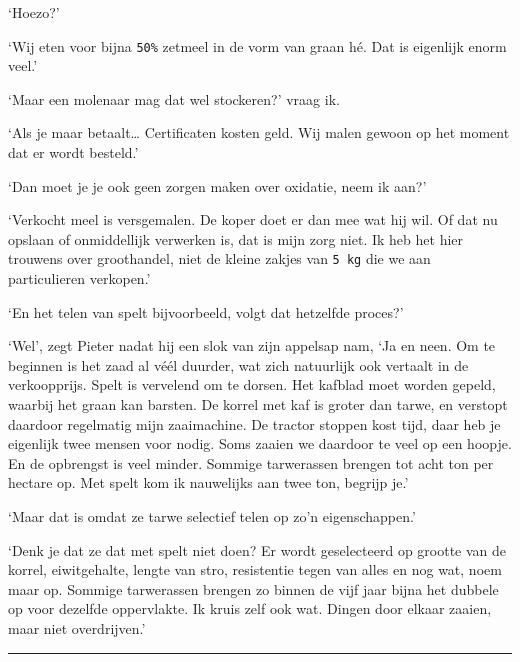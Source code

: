 \documentclass[
  11pt,
  dutch,
]{memoir}
\begin{document}
`Hoezo?'

`Wij eten voor bijna \texttt{50\%} zetmeel in de vorm van graan hé. Dat
is eigenlijk enorm veel.'

`Maar een molenaar mag dat wel stockeren?' vraag ik.

`Als je maar betaalt\ldots{} Certificaten kosten geld. Wij malen gewoon
op het moment dat er wordt besteld.'

`Dan moet je je ook geen zorgen maken over oxidatie, neem ik aan?'

`Verkocht meel is versgemalen. De koper doet er dan mee wat hij wil. Of
dat nu opslaan of onmiddellijk verwerken is, dat is mijn zorg niet. Ik
heb het hier trouwens over groothandel, niet de kleine zakjes van
\texttt{5\ kg} die we aan particulieren verkopen.'

`En het telen van spelt bijvoorbeeld, volgt dat hetzelfde proces?'

`Wel', zegt Pieter nadat hij een slok van zijn appelsap nam, `Ja en
neen. Om te beginnen is het zaad al véél duurder, wat zich natuurlijk
ook vertaalt in de verkoopprijs. Spelt is vervelend om te dorsen. Het
kafblad moet worden gepeld, waarbij het graan kan barsten. De korrel met
kaf is groter dan tarwe, en verstopt daardoor regelmatig mijn
zaaimachine. De tractor stoppen kost tijd, daar heb je eigenlijk twee
mensen voor nodig. Soms zaaien we daardoor te veel op een hoopje. En de
opbrengst is veel minder. Sommige tarwerassen brengen tot acht ton per
hectare op. Met spelt kom ik nauwelijks aan twee ton, begrijp je.'

`Maar dat is omdat ze tarwe selectief telen op zo'n eigenschappen.'

`Denk je dat ze dat met spelt niet doen? Er wordt geselecteerd op
grootte van de korrel, eiwitgehalte, lengte van stro, resistentie tegen
van alles en nog wat, noem maar op. Sommige tarwerassen brengen zo
binnen de vijf jaar bijna het dubbele op voor dezelfde oppervlakte. Ik
kruis zelf ook wat. Dingen door elkaar zaaien, maar niet overdrijven.'

\pfbreak
\end{document}
